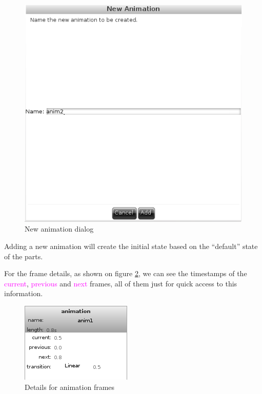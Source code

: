 \documentclass[a4paper]{profusion}
\newcommand{\GUILabel}[1]{\textcolor{magenta}{#1}}
\begin{document}
\begin{figure}[h!]
  \centering
  \includegraphics{images/animation_dialog_new.png}
  \caption{New animation dialog}
  \label{fig:animation_dialog_new}
\end{figure}

Adding a new animation will create the initial state based on the
``default'' state of the parts.

For the frame details, as shown on figure
\ref{fig:animation_frame_details}, we can see the timestamps of the
\GUILabel{current}, \GUILabel{previous} and \GUILabel{next} frames,
all of them just for quick access to this information.

\begin{figure}[h!]
  \centering
  \includegraphics{images/animation_frame_details.png}
  \caption{Details for animation frames}
  \label{fig:animation_frame_details}
\end{figure}
\end{document}
